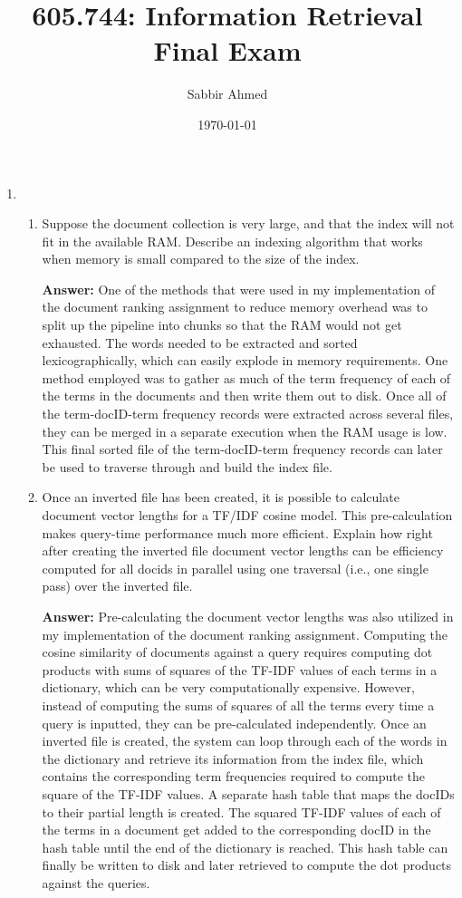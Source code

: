 \documentclass[11pt]{article}
\title{605.744: Information Retrieval \\ Final Exam}
\author{Sabbir Ahmed}
\date{\today}
\begin{document}
\maketitle
\begin{enumerate}

  \item \begin{enumerate}
          \item Suppose the document collection is very large, and that the index will not fit in the available RAM. Describe an indexing algorithm that works when memory is small compared to the size of the index.

                \textbf{Answer:} One of the methods that were used in my implementation of the document ranking assignment to reduce memory overhead was to split up the pipeline into chunks so that the RAM would not get exhausted. The words needed to be extracted and sorted lexicographically, which can easily explode in memory requirements. One method employed was to gather as much of the term frequency of each of the terms in the documents and then write them out to disk. Once all of the term-docID-term frequency records were extracted across several files, they can be merged in a separate execution when the RAM usage is low. This final sorted file of the term-docID-term frequency records can later be used to traverse through and build the index file.

          \item Once an inverted file has been created, it is possible to calculate document vector lengths for a TF/IDF cosine model. This pre-calculation makes query-time performance much more efficient. Explain how right after creating the inverted file document vector lengths can be efficiency computed for all docids in parallel using one traversal (i.e., one single pass) over the inverted file.

                \textbf{Answer:} Pre-calculating the document vector lengths was also utilized in my implementation of the document ranking assignment. Computing the cosine similarity of documents against a query requires computing dot products with sums of squares of the TF-IDF values of each terms in a dictionary, which can be very computationally expensive. However, instead of computing the sums of squares of all the terms every time a query is inputted, they can be pre-calculated independently. Once an inverted file is created, the system can loop through each of the words in the dictionary and retrieve its information from the index file, which contains the corresponding term frequencies required to compute the square of the TF-IDF values. A separate hash table that maps the docIDs to their partial length is created. The squared TF-IDF values of each of the terms in a document get added to the corresponding docID in the hash table until the end of the dictionary is reached. This hash table can finally be written to disk and later retrieved to compute the dot products against the queries.


\end{enumerate}
\end{enumerate}
\end{document}
